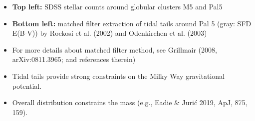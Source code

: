 \documentclass[letterpaper,landscape]{slides}
\begin{document}
\begin{slide}
{\begin{minipage}[t]{13cm}
\begin{itemize}
\item {\bf Top left:} SDSS stellar counts around globular clusters 
             M5 and Pal5 
\item {\bf Bottom left:} matched filter extraction of tidal tails around
         Pal 5 (gray: SFD E(B-V)) by Rockosi et al. (2002) and
         Odenkirchen et al. (2003)
\item For more details about matched filter method, see Grillmair (2008,
       arXiv:0811.3965; and references therein)
\item {\color{blue} Tidal tails provide strong constraints on the Milky 
       Way gravitational potential.} 
\item {Overall distribution constrains the mass 
	   (e.g., Eadie \& Juri\'{c} 2019, ApJ, 875, 159).} 
\end{itemize}

\end{minipage}}
\vfill 
\end{slide}





	
\end{document}
